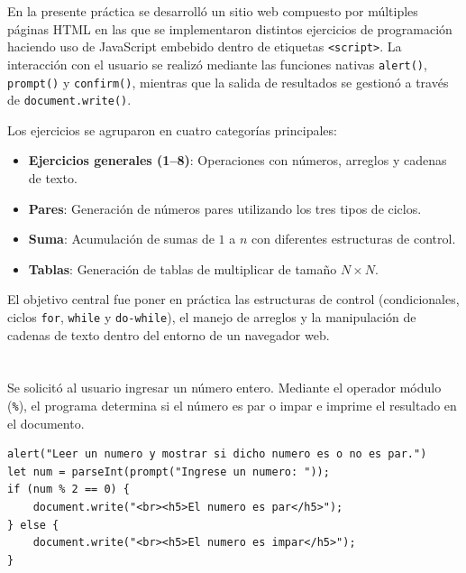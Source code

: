 \documentclass[10pt,a4paper]{article}
\begin{document}
En la presente práctica se desarrolló un sitio web compuesto por múltiples páginas HTML en las que se implementaron distintos ejercicios de programación haciendo uso de JavaScript embebido dentro de etiquetas \texttt{<script>}. La interacción con el usuario se realizó mediante las funciones nativas \texttt{alert()}, \texttt{prompt()} y \texttt{confirm()}, mientras que la salida de resultados se gestionó a través de \texttt{document.write()}.

Los ejercicios se agruparon en cuatro categorías principales:
\begin{itemize}
    \item \textbf{Ejercicios generales (1--8)}: Operaciones con números, arreglos y cadenas de texto.
    \item \textbf{Pares}: Generación de números pares utilizando los tres tipos de ciclos.
    \item \textbf{Suma}: Acumulación de sumas de $1$ a $n$ con diferentes estructuras de control.
    \item \textbf{Tablas}: Generación de tablas de multiplicar de tamaño $N \times N$.
\end{itemize}

El objetivo central fue poner en práctica las estructuras de control (condicionales, ciclos \texttt{for}, \texttt{while} y \texttt{do-while}), el manejo de arreglos y la manipulación de cadenas de texto dentro del entorno de un navegador web.

\section{\color{colorIPN}{Desarrollo}}

\subsection{\color{colorESCOM}{Ejercicios Generales}}

\subsubsection{\color{colorESCOM}{Ejercicio 1: Número par o impar}}

Se solicitó al usuario ingresar un número entero. Mediante el operador módulo (\texttt{\%}), el programa determina si el número es par o impar e imprime el resultado en el documento.

\begin{lstlisting}[style=jsStyle, caption={Ejercicio 1 -- Par o impar}]
alert("Leer un numero y mostrar si dicho numero es o no es par.")
let num = parseInt(prompt("Ingrese un numero: "));
if (num % 2 == 0) {
    document.write("<br><h5>El numero es par</h5>");
} else {
    document.write("<br><h5>El numero es impar</h5>");
}
\end{lstlisting}
\end{document}
